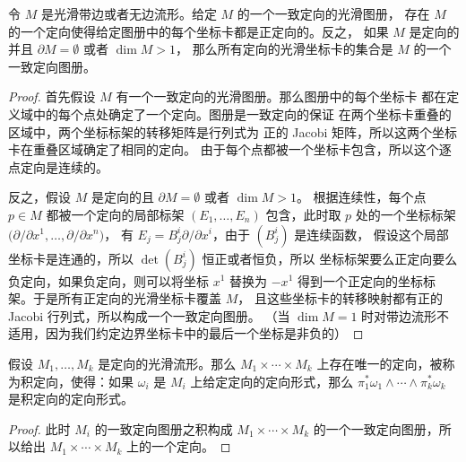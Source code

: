 \begin{proposition}[通过坐标图册确定的定向]
  令 $M$ 是光滑带边或者无边流形。给定 $M$ 的一个一致定向的光滑图册，
  存在 $M$ 的一个定向使得给定图册中的每个坐标卡都是正定向的。反之，
  如果 $M$ 是定向的并且 $\partial M=\emptyset$ 或者 $\dim M>1$，
  那么所有定向的光滑坐标卡的集合是 $M$ 的一个一致定向图册。
\end{proposition}
\begin{proof}
  首先假设 $M$ 有一个一致定向的光滑图册。那么图册中的每个坐标卡
  都在定义域中的每个点处确定了一个定向。图册是一致定向的保证
  在两个坐标卡重叠的区域中，两个坐标标架的转移矩阵是行列式为
  正的 Jacobi 矩阵，所以这两个坐标卡在重叠区域确定了相同的定向。
  由于每个点都被一个坐标卡包含，所以这个逐点定向是连续的。

  反之，假设 $M$ 是定向的且 $\partial M=\emptyset$ 或者 $\dim M>1$。
  根据连续性，每个点 $p\in M$ 都被一个定向的局部标架 $(E_1,\dots,E_n)$
  包含，此时取 $p$ 处的一个坐标标架 $\bigl(\partial/\partial x^1,\dots,\partial/\partial x^n\bigr)$，
  有 $E_j=B^i_j\partial/\partial x^i$，由于 $(B_j^i)$ 是连续函数，
  假设这个局部坐标卡是连通的，所以 $\det(B_j^i)$ 恒正或者恒负，所以
  坐标标架要么正定向要么负定向，如果负定向，则可以将坐标 $x^1$ 替换为 
  $-x^1$ 得到一个正定向的坐标标架。于是所有正定向的光滑坐标卡覆盖 $M$，
  且这些坐标卡的转移映射都有正的 Jacobi 行列式，所以构成一个一致定向图册。
  （当 $\dim M=1$ 时对带边流形不适用，因为我们约定边界坐标卡中的最后一个坐标是非负的）
\end{proof}

\begin{proposition}[积定向]
  假设 $M_1,\dots,M_k$ 是定向的光滑流形。那么 $M_1\times\cdots\times M_k$
  上存在唯一的定向，被称为积定向，使得：如果 $\omega_i$ 是 $M_i$ 上给定定向的定向形式，那么
  $\pi_1^*\omega_1\wedge\cdots\wedge\pi_k^*\omega_k$ 是积定向的定向形式。
\end{proposition}
\begin{proof}
  此时 $M_i$ 的一致定向图册之积构成 $M_1\times\cdots\times M_k$
  的一个一致定向图册，所以给出 $M_1\times\cdots\times M_k$ 上的一个定向。
\end{proof}

